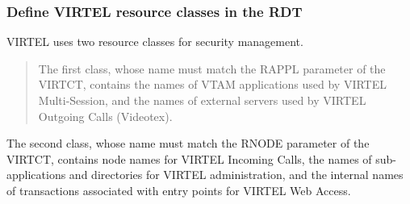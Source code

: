 \documentclass[letterpaper,10pt,english]{sphinxmanual}
\begin{document}
\subsubsection{Define VIRTEL resource classes in the RDT}
\label{\detokenize{Installation_Guide:define-virtel-resource-classes-in-the-rdt}}
\begin{sphinxVerbatim}[commandchars=\\\{\}]
  
  
\end{sphinxVerbatim}


VIRTEL uses two resource classes for security management.
\begin{quote}

The first class, whose name must match the RAPPL parameter of the VIRTCT, contains the names of VTAM applications used by VIRTEL Multi-Session, and the names of external servers used by VIRTEL Outgoing Calls (Videotex).
\end{quote}

The second class, whose name must match the RNODE parameter of the  VIRTCT, contains node names for VIRTEL Incoming Calls, the names of sub-applications and directories for VIRTEL administration, and the internal names of transactions associated with entry points for VIRTEL Web Access.
\end{document}
